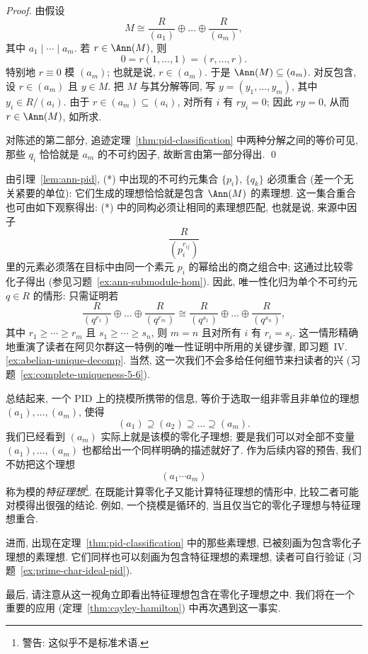 \begin{proof}
由假设
$$
M\cong\frac{R}{(a_1)}\oplus\dots\oplus\frac{R}{(a_m)},
$$
其中 $a_1\mid\cdots\mid a_m$. 若 $r\in\Ann(M)$, 则
$$
0=r(1,\dots,1)=(r,\dots,r).
$$
特别地 $r\equiv 0$ 模 $(a_m)$; 也就是说, $r\in(a_m)$. 于是 $\Ann(M)\subseteq(a_m)$. 对反包含, 设 $r\in(a_m)$ 且 $y\in M$. 把 $M$ 与其分解等同, 写 $y=(y_1,\ldots,y_m)$, 其中 $y_i\in R/(a_i)$. 由于 $r\in(a_m)\subseteq(a_i)$, 对所有 $i$ 有 $ry_i=0$; 因此 $ry=0$, 从而 $r\in\Ann(M)$, 如所求.

对陈述的第二部分, 追迹定理~\ref{thm:pid-classification} 中两种分解之间的等价可见, 那些 $q_i$ 恰恰就是 $a_m$ 的不可约因子, 故断言由第一部分得出. \qed
\end{proof}

由引理~\ref{lem:ann-pid}, (*) 中出现的不可约元集合 $\{p_i\}$, $\{q_k\}$ 必须重合 (差一个无关紧要的单位): 它们生成的理想恰恰就是包含 $\Ann(M)$ 的素理想. 这一集合重合也可由如下观察得出: (*) 中的同构必须让相同的素理想匹配, 也就是说, 来源中因子
$$
\frac{R}{(p_i^{r_{ij}})}
$$
里的元素必须落在目标中由同一个素元 $p_i$ 的幂给出的商之组合中; 这通过比较零化子得出 (参见习题~\ref{ex:ann-submodule-hom}). 因此, 唯一性化归为单个不可约元 $q\in R$ 的情形: 只需证明若
$$
\frac{R}{(q^{r_1})}\oplus\dots\oplus\frac{R}{(q^{r_m})}\cong\frac{R}{(q^{s_1})}\oplus\dots\oplus\frac{R}{(q^{s_n})},
$$
其中 $r_1\ge\cdots\ge r_m$ 且 $s_1\ge\cdots\ge s_n$, 则 $m=n$ 且对所有 $i$ 有 $r_i=s_i$. 这一情形精确地重演了读者在阿贝尔群这一特例的唯一性证明中所用的关键步骤, 即习题~IV.\ref{ex:abelian-unique-decomp}. 当然, 这一次我们不会多给任何细节来扫读者的兴 (习题~\ref{ex:complete-uniqueness-5-6}).

\begin{remark}\label{rmk:char-ideal}
总结起来, 一个 PID 上的挠模所携带的信息, 等价于选取一组非零且非单位的理想 $(a_1),\ldots,(a_m)$, 使得
$$
(a_1)\supseteq(a_2)\supseteq\dots\supseteq(a_m).
$$
我们已经看到 $(a_m)$ 实际上就是该模的零化子理想; 要是我们可以对全部不变量 $(a_1),\ldots,(a_m)$ 也都给出一个同样明确的描述就好了. 作为后续内容的预告, 我们不妨把这个理想
$$
(a_1\cdots a_m)
$$
称为模的\emph{特征理想}\footnote{警告: 这似乎不是标准术语.}. 在既能计算零化子又能计算特征理想的情形中, 比较二者可能对模得出很强的结论. 例如, 一个挠模是循环的, 当且仅当它的零化子理想与特征理想重合.

进而, 出现在定理~\ref{thm:pid-classification} 中的那些素理想, 已被刻画为包含零化子理想的素理想. 它们同样也可以刻画为包含特征理想的素理想, 读者可自行验证 (习题~\ref{ex:prime-char-ideal-pid}).

最后, 请注意从这一视角立即看出特征理想包含在零化子理想之中. 我们将在一个重要的应用 (定理~\ref{thm:cayley-hamilton}) 中再次遇到这一事实.
\end{remark}

